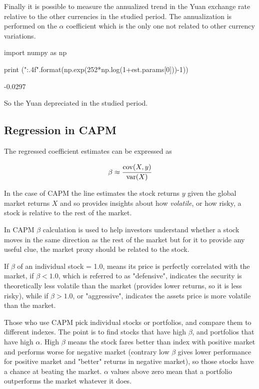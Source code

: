 Finally it is possible to measure the annualized trend in the Yuan exchange rate relative to the other currencies in the studied period. The annualization is performed on the $\alpha$ coefficient which is the only one not related to other currency variations.

\begin{ipython}
import numpy as np

print ("{:.4f}".format(np.exp(252*np.log(1+est.params[0]))-1))
\end{ipython}
\begin{ioutput}
-0.0297
\end{ioutput}
\noindent
So the Yuan depreciated in the studied period.

\subsection{Regression in CAPM}

The regressed coefficient estimates can be expressed as 

\begin{equation}
\beta \approx \cfrac{\textrm{cov}(X,y)}{\textrm {var}(X)}
\end{equation}

In the case of CAPM the line estimates the stock returns $y$ given the global market returns $X$ and so provides insights about how \emph{volatile}, or how risky, a stock is relative to the rest of the market.

In CAPM $\beta$ calculation is used to help investors understand whether a stock moves in the same direction as the rest of the market but for it to provide any useful clue, the market proxy should be related to the stock.

If $\beta$ of an individual stock = 1.0, means its price is perfectly correlated with the market, if $\beta < 1.0$, which is referred to as "defensive", indicates the security is theoretically less volatile than the market (provides lower returns, so it is less risky), while if $\beta > 1.0$, or "aggressive", indicates the assets price is more volatile than the market.

Those who use CAPM pick individual stocks or portfolios, and compare them to different indexes. The point is to find stocks that have high $\beta$, and portfolios that have high $\alpha$. High $\beta$ means the stock fares better than index with positive market and performs worse for negative market (contrary low $\beta$ gives lower performance for positive market and "better" returns in negative market), so those stocks have a chance at beating the market. $\alpha$ values above zero mean that a portfolio outperforms the market whatever it does.

